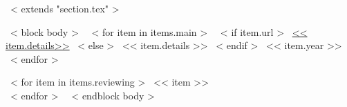 ~< extends "section.tex" >~

~< block body >~
  ~< for item in items.main >~
    ~< if item.url >~
      \href{<< item.url >>}{<< item.details>>}
    ~< else >~
      << item.details >>
    ~< endif >~
    \hfill << item.year >> \\
~< endfor >~

~< for item in items.reviewing >~
<< item >> \\
~< endfor >~
~< endblock body >~